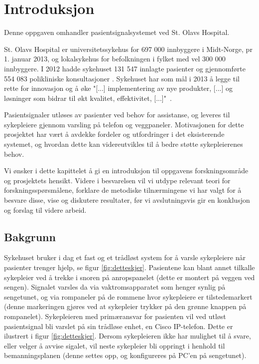 \chapter{Introduksjon}
\label{chp:introduksjon}
Denne oppgaven omhandler pasientsignalsystemet ved St. Olavs Hospital.

\noindent
St. Olavs Hospital er universitetssykehus for 697 000 innbyggere i Midt-Norge, pr 1. januar 2013, og lokalsykehus for befolkningen i fylket med vel 300 000 innbyggere. I 2012 hadde sykehuset 131 547 innlagte pasienter og gjennomførte 554 083 polikliniske konsultasjoner \cite{stolavs}. Sykehuset har som mål i 2013 å legge til rette for innovasjon og å øke "[...] implementering av nye produkter, [...] og løsninger som bidrar til økt kvalitet, effektivitet, [...]"\ \cite{styring13}.

\noindent
Pasientsignaler utløses av pasienter ved behov for assistanse, og leveres til sykepleiere gjennom varsling på telefon og veggpaneler. Motivasjonen for dette prosjektet har vært å avdekke fordeler og utfordringer i det eksisterende systemet, og hvordan dette kan videreutvikles til å bedre støtte sykepleierenes behov.

\noindent
Vi ønsker i dette kapittelet å gi en introduksjon til oppgavens forskningsområde og prosjektets hensikt. Videre i besvarelsen vil vi utdype relevant teori for forskningsspørsmålene, forklare de metodiske tilnærmingene vi har valgt for å besvare disse, vise og diskutere resultater, før vi avslutningsvis gir en konklusjon og forslag til videre arbeid.

\section{Bakgrunn}
Sykehuset bruker i dag et fast og et trådløst system for å varsle sykepleiere når pasienter trenger hjelp, se figur \ref{fig:detteskjer}. Pasientene kan blant annet tilkalle sykepleier ved å trekke i snoren på anropspanelet (dette er montert på veggen ved sengen). Signalet varsles da via vaktromsapparatet som henger synlig på sengetunet, og via rompaneler på de rommene hvor sykepleiere er tilstedemarkert (denne markeringen gjøres ved at sykepleier trykker på den grønne knappen på rompanelet). 
Sykepleieren med primæransvar for pasienten vil ved utløst pasientsignal bli varslet på sin trådløse enhet, en Cisco IP-telefon. Dette er ilustrert i figur \ref{fig:detteskjer}. Dersom sykepleieren ikke har mulighet til å svare, eller velger å avvise sigalet, vil neste sykepleier bli oppringt i henhold til bemanningsplanen (denne settes opp, og konfigureres på PC'en på sengetunet).

